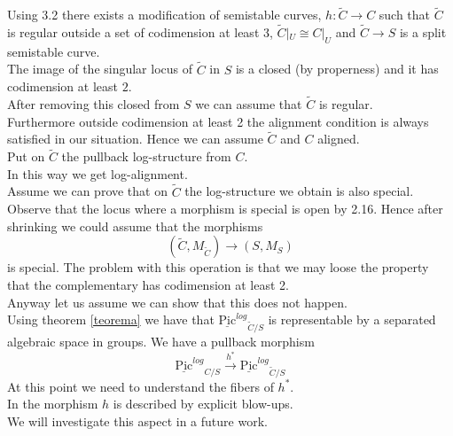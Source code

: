 \documentclass{amsart}
\theoremstyle{definition}
\numberwithin{equation}{section}
\begin{document}
Using \cite{alter} 3.2 there exists a modification of semistable curves, $h:\tilde{C}{\rightarrow} C$ such that $\tilde{C}$ is regular outside a set of codimension at least 3, $\tilde{C}|_U\cong C|_U$ and $\tilde{C}{\rightarrow} S$ is a split semistable curve.\\
The image of the singular locus of $\tilde{C}$ in $S$ is a closed (by properness) and it has codimension at least $2$.\\
After removing this closed from $S$ we can assume that $\tilde{C}$ is regular.\\
Furthermore outside codimension at least 2 the alignment condition is always satisfied in our situation. Hence we can assume $\tilde{C}$ and $C$ aligned.\\

\noindent Put on $\tilde{C}$ the pullback log-structure from $C$.\\
In this way we get log-alignment. \\
Assume we can prove that on $\tilde{C}$ the log-structure we obtain is also special.
Observe that the locus where a morphism is special is open by \cite{olun} 2.16. 
Hence after shrinking we could assume that the morphisms 
$$
(\tilde{C},M_{\tilde{C}}){\rightarrow} (S,M_S)
$$
\noindent 
is special. The problem with this operation is that we may loose the property that the complementary has codimension at least 2. \\
Anyway let us assume we can show that this does not happen.\\
Using theorem \ref{teorema} we have that
${\underline{\mbox{Pic}}^{log}}_{\tilde{C}/S}$ is representable by a separated algebraic space in groups. We have a pullback morphism
$$
{\underline{\mbox{Pic}}^{log}}_{C/S}\stackrel{h^{*}}{\rightarrow} {\underline{\mbox{Pic}}^{log}}_{\tilde{C}/S}
$$
\noindent At this point we need to understand the fibers of $h^{*}$.\\ In \cite{alter} the morphism $h$ is described by explicit blow-ups. \\
We will investigate this aspect in a future work.\\
\end{document}
